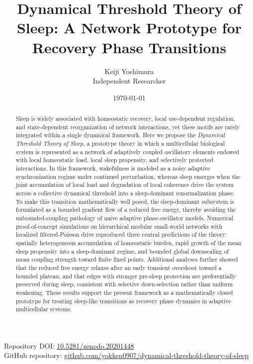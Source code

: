 \documentclass[12pt]{article}
\title{Dynamical Threshold Theory of Sleep: A Network Prototype for Recovery Phase Transitions}
\author{Keiji Yoshimura \\ \small Independent Researcher}
\date{\today}
\begin{document}
\maketitle

\begin{center}
\small
Repository DOI: \href{https://doi.org/10.5281/zenodo.20201448}{10.5281/zenodo.20201448}\\
GitHub repository: \href{https://github.com/yokken0907/dynamical-threshold-theory-of-sleep}{github.com/yokken0907/dynamical-threshold-theory-of-sleep}
\end{center}

\begin{abstract}
Sleep is widely associated with homeostatic recovery, local use-dependent regulation, and state-dependent reorganization of network interactions, yet these motifs are rarely integrated within a single dynamical framework. Here we propose the \emph{Dynamical Threshold Theory of Sleep}, a prototype theory in which a multicellular biological system is represented as a network of adaptively coupled oscillatory elements endowed with local homeostatic load, local sleep propensity, and selectively protected interactions. In this framework, wakefulness is modeled as a noisy adaptive synchronization regime under continued perturbation, whereas sleep emerges when the joint accumulation of local load and degradation of local coherence drive the system across a collective dynamical threshold into a sleep-dominant renormalization phase. To make this transition mathematically well posed, the sleep-dominant subsystem is formulated as a bounded gradient flow of a reduced free energy, thereby avoiding the unbounded-coupling pathology of naive adaptive phase-oscillator models. Numerical proof-of-concept simulations on hierarchical modular small-world networks with localized filtered-Poisson drive reproduced three central predictions of the theory: spatially heterogeneous accumulation of homeostatic burden, rapid growth of the mean sleep propensity into a sleep-dominant regime, and bounded global downscaling of mean coupling strength toward finite fixed points. Additional analyses further showed that the reduced free energy relaxes after an early transient overshoot toward a bounded plateau, and that edges with stronger pre-sleep protection are preferentially preserved during sleep, consistent with selective down-selection rather than uniform weakening. These results support the present framework as a mathematically closed prototype for treating sleep-like transitions as recovery phase dynamics in adaptive multicellular systems.
\end{abstract}
\end{document}

